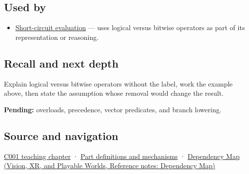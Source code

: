 \subsection{Used by}\label{appendix-fe6b457d68d8-used-by}

\hypertarget{appendix-fe6b457d68d8-used-by}{}

\begin{itemize}
\tightlist
\item
  \hyperref[appendix-2e245a6fa8d3]{Short-circuit evaluation} --- uses logical versus bitwise operators as part of its representation or reasoning.
\end{itemize}

\subsection{Recall and next depth}\label{appendix-fe6b457d68d8-recall-and-next-depth}

\hypertarget{appendix-fe6b457d68d8-recall-and-next-depth}{}

Explain logical versus bitwise operators without the label, work the example above, then state the assumption whose removal would change the result.

\textbf{Pending:} overloads, precedence, vector predicates, and branch lowering.

\subsection{Source and navigation}\label{appendix-fe6b457d68d8-source-and-navigation}

\hypertarget{appendix-fe6b457d68d8-source-and-navigation}{}

\hyperref[01-foundations-i-ch001-from-a-signal-to-an-interpretation]{C001 teaching chapter} · \hyperref[appendix-fd090d982a15]{Part definitions and mechanisms} · \href{../07-Vision-XR-and-Playable-Worlds/main.pdf\#nameddest=appendix-4ad47bdd269a}{Dependency Map (Vision, XR, and Playable Worlds, Reference notes: Dependency Map)}
